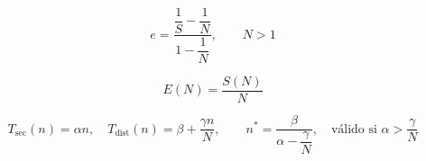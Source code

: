 \documentclass[11pt,a4paper]{article}
\begin{document}
\begin{equation}
e = \dfrac{\dfrac{1}{S}-\dfrac{1}{N}}{1-\dfrac{1}{N}}, \qquad N>1
\label{eq:karpflatt}
\end{equation}

\begin{equation}
E(N) = \frac{S(N)}{N}
\label{eq:eficiencia}
\end{equation}

\begin{equation}
T_{\text{sec}}(n)=\alpha n, \quad T_{\text{dist}}(n)=\beta+\frac{\gamma n}{N}, \qquad
n^{*} = \frac{\beta}{\alpha-\dfrac{\gamma}{N}}, \quad \text{válido si } \alpha>\frac{\gamma}{N}
\label{eq:umbral}
\end{equation}

\clearpage
\printbibliography[title={Referencias}]
\end{document}
